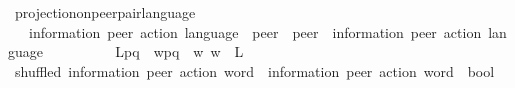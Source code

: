\begin{isabellebody}
\isanewline
{}\isamarkupfalse%
\ projection{\isacharunderscore}{\kern0pt}on{\isacharunderscore}{\kern0pt}peer{\isacharunderscore}{\kern0pt}pair{\isacharunderscore}{\kern0pt}language\isanewline
\ \ {\isacharcolon}{\kern0pt}{\isacharcolon}{\kern0pt}\ {\isachardoublequoteopen}{\isacharparenleft}{\kern0pt}{\isacharprime}{\kern0pt}information{\isacharcomma}{\kern0pt}\ {\isacharprime}{\kern0pt}peer{\isacharparenright}{\kern0pt}\ action\ language\ {\isasymRightarrow}\ {\isacharprime}{\kern0pt}peer\ {\isasymRightarrow}\ {\isacharprime}{\kern0pt}peer\ {\isasymRightarrow}\ {\isacharparenleft}{\kern0pt}{\isacharprime}{\kern0pt}information{\isacharcomma}{\kern0pt}\ {\isacharprime}{\kern0pt}peer{\isacharparenright}{\kern0pt}\ action\ language{\isachardoublequoteclose}\isanewline
\ \ {\isacharparenleft}{\kern0pt}{\isachardoublequoteopen}{\isacharunderscore}{\kern0pt}{\isasymdownharpoonright}\isactrlsub {\isacharbraceleft}{\kern0pt}\isactrlsub {\isacharunderscore}{\kern0pt}\isactrlsub {\isacharcomma}{\kern0pt}\isactrlsub {\isacharunderscore}{\kern0pt}\isactrlsub {\isacharbraceright}{\kern0pt}{\isachardoublequoteclose}\ {\isacharbrackleft}{\kern0pt}{}{}{\isacharcomma}{\kern0pt}\ {}{}{\isacharcomma}{\kern0pt}\ {}{}{\isacharbrackright}{\kern0pt}\ {}{}{}{\isacharparenright}{\kern0pt}\ \isanewline
\ \ {\isachardoublequoteopen}{\isacharparenleft}{\kern0pt}L{\isasymdownharpoonright}\isactrlsub {\isacharbraceleft}{\kern0pt}\isactrlsub p\isactrlsub {\isacharcomma}{\kern0pt}\isactrlsub q\isactrlsub {\isacharbraceright}{\kern0pt}{\isacharparenright}{\kern0pt}\ {\isasymequiv}\ {\isacharbraceleft}{\kern0pt}{\isacharparenleft}{\kern0pt}w{\isasymdown}\isactrlsub {\isacharbraceleft}{\kern0pt}\isactrlsub p\isactrlsub {\isacharcomma}{\kern0pt}\isactrlsub q\isactrlsub {\isacharbraceright}{\kern0pt}{\isacharparenright}{\kern0pt}\ {\isacharbar}{\kern0pt}\ w{\isachardot}{\kern0pt}\ w\ {\isasymin}\ L{\isacharbraceright}{\kern0pt}{\isachardoublequoteclose}%
\isadelimdocument
%
\endisadelimdocument
%
\isatagdocument
%
\isamarkuptrue%
%
\endisatagdocument
{\isafolddocument}%
%
\isadelimdocument
%
\endisadelimdocument
{}\isamarkupfalse%
\ shuffled\ {\isacharcolon}{\kern0pt}{\isacharcolon}{\kern0pt}{\isachardoublequoteopen}{\isacharparenleft}{\kern0pt}{\isacharprime}{\kern0pt}information{\isacharcomma}{\kern0pt}\ {\isacharprime}{\kern0pt}peer{\isacharparenright}{\kern0pt}\ action\ word\ {\isasymRightarrow}\ {\isacharparenleft}{\kern0pt}{\isacharprime}{\kern0pt}information{\isacharcomma}{\kern0pt}\ {\isacharprime}{\kern0pt}peer{\isacharparenright}{\kern0pt}\ action\ word\ {\isasymRightarrow}\ bool{\isachardoublequoteclose}\ \isanewline

\end{isabellebody}
